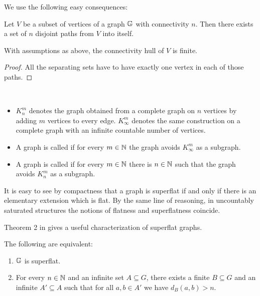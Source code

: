 We use the following easy consequences:

\begin{Corollary} \label{cr_disjoint_paths}
  Let $V$ be a subset of vertices of a graph $\mathbb G$ with connectivity $n$. Then there exists a set of $n$ disjoint paths from $V$ into itself.
\end{Corollary}

\begin{Corollary} \label{cr_hull_finite}
  With assumptions as above, the connectivity hull of $V$ is finite.
\end{Corollary}

\begin{proof}
  All the separating sets have to have exactly one vertex in each of those paths. 
\end{proof}

\begin{Definition} \ 
  \begin{itemize}
  \item $K^m_n$ denotes the graph obtained from a complete graph on $n$ vertices by adding $m$ vertices to every edge.
    $K^m_\infty$ denotes the same construction on a complete graph with an infinite countable number of vertices.
    \item A graph is called \defn{flat} if for every $m \in \mathbb{N}$ the graph avoids $K^m_\infty$ as a subgraph. 
    \item A graph is called \defn{superflat} if for every $m \in \mathbb{N}$ there is $n \in \mathbb{N}$ such that the graph avoids $K^m_n$ as a subgraph. 
  \end{itemize}
\end{Definition}
It is easy to see by compactness that a graph is superflat if and only if there is an elementary extension which is flat.
By the same line of reasoning, in uncountably saturated structures the notions of flatness and superflatness coincide.

Theorem 2 in \cite{stable_graphs} gives a useful characterization of superflat graphs.

\begin{Theorem} \label{th_superflat_equivalence}
  The following are equivalent:
  \begin{enumerate}
  \item $\mathbb G$ is superflat.
  \item For every $n \in \mathbb{N}$ and an infinite set $A \subseteq G$, there exists a finite $B \subseteq G$ and an infinite $A' \subseteq A$
    such that for all $a,b \in A'$ we have $d_{B}(a,b) > n$.
  \end{enumerate}
\end{Theorem}

